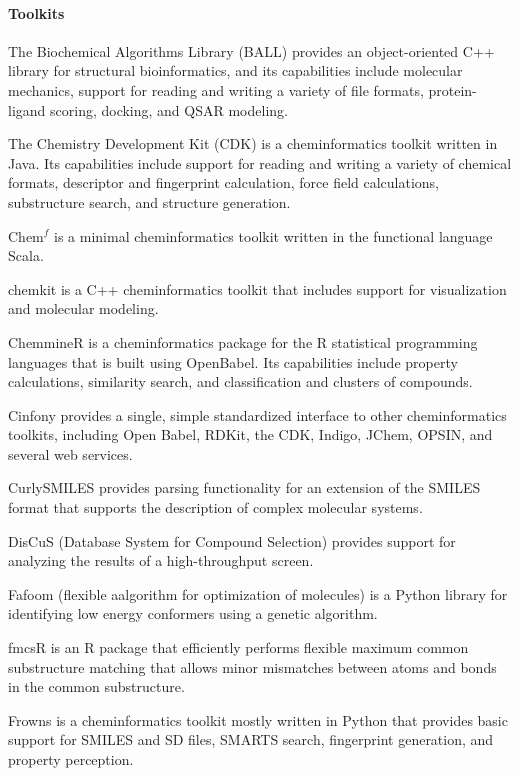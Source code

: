 \paragraph{Toolkits}
The Biochemical Algorithms Library (BALL) \cite{Hildebrandt_2010} provides an object-oriented C++ library for structural bioinformatics, and its capabilities include molecular mechanics, support for reading and writing a variety of file formats, protein-ligand scoring, docking, and QSAR modeling.

The Chemistry Development Kit (CDK) \cite{Steinbeck_2006} is a cheminformatics toolkit written in Java.  Its capabilities include support for reading and writing a variety of chemical formats, descriptor and fingerprint calculation, force field calculations, substructure search, and structure generation.

Chem$^f$ \cite{H_ck_2012} is a minimal cheminformatics toolkit written in the functional language Scala.

chemkit is a C++ cheminformatics toolkit that includes support for visualization and molecular modeling.

ChemmineR \cite{Cao_2008}  is a cheminformatics package for the R statistical programming languages that is built using OpenBabel. Its capabilities include property calculations, similarity search, and classification and clusters of compounds.

Cinfony \cite{cinfony} provides a single, simple standardized interface to other cheminformatics toolkits, including Open Babel, RDKit, the CDK, Indigo, JChem, OPSIN, and several web services.

CurlySMILES \cite{Drefahl_2011} provides parsing functionality for an extension of the SMILES format that supports the description of complex molecular systems.

DisCuS (Database System for Compound Selection) \cite{W_jcikowski_2014} provides support for analyzing the results of a high-throughput screen.

Fafoom (flexible aalgorithm for optimization of molecules) \cite{Supady_2015} is a Python library for identifying low energy conformers using a genetic algorithm.

fmcsR \cite{Goecks_2010} is an R package that efficiently performs flexible maximum common substructure matching that allows minor mismatches between atoms and bonds in the common substructure.

Frowns is a cheminformatics toolkit mostly written in Python that provides basic support for SMILES and SD files, SMARTS search, fingerprint generation, and property perception.

